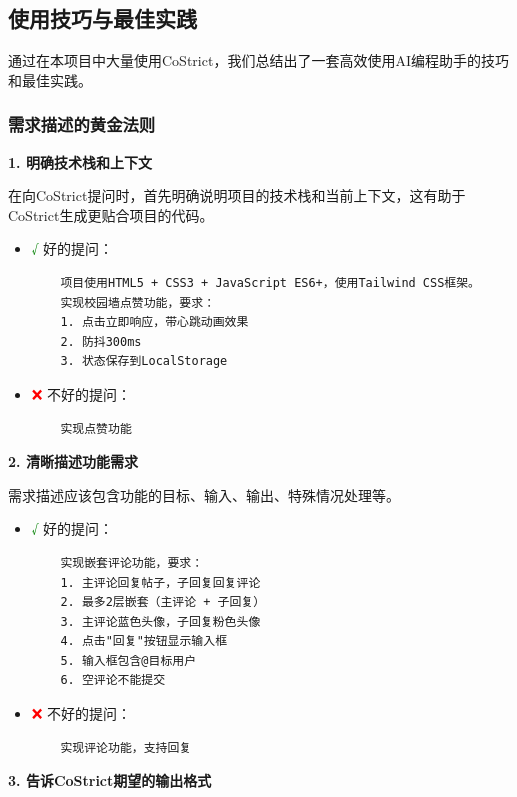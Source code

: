 ﻿\documentclass[12pt,a4paper]{article}
\begin{document}
\subsection{使用技巧与最佳实践}

通过在本项目中大量使用CoStrict，我们总结出了一套高效使用AI编程助手的技巧和最佳实践。

\subsubsection{需求描述的黄金法则}

\textbf{1. 明确技术栈和上下文}

在向CoStrict提问时，首先明确说明项目的技术栈和当前上下文，这有助于CoStrict生成更贴合项目的代码。

\begin{itemize}
    \item \textcolor{green}{√} 好的提问：
    \begin{verbatim}
    项目使用HTML5 + CSS3 + JavaScript ES6+，使用Tailwind CSS框架。
    实现校园墙点赞功能，要求：
    1. 点击立即响应，带心跳动画效果
    2. 防抖300ms
    3. 状态保存到LocalStorage
    \end{verbatim}
    \item \textcolor{red}{❌} 不好的提问：
    \begin{verbatim}
    实现点赞功能
    \end{verbatim}
\end{itemize}

\textbf{2. 清晰描述功能需求}

需求描述应该包含功能的目标、输入、输出、特殊情况处理等。

\begin{itemize}
    \item \textcolor{green}{√} 好的提问：
    \begin{verbatim}
    实现嵌套评论功能，要求：
    1. 主评论回复帖子，子回复回复评论
    2. 最多2层嵌套（主评论 + 子回复）
    3. 主评论蓝色头像，子回复粉色头像
    4. 点击"回复"按钮显示输入框
    5. 输入框包含@目标用户
    6. 空评论不能提交
    \end{verbatim}
    \item \textcolor{red}{❌} 不好的提问：
    \begin{verbatim}
    实现评论功能，支持回复
    \end{verbatim}
\end{itemize}

\textbf{3. 告诉CoStrict期望的输出格式}
\end{document}
